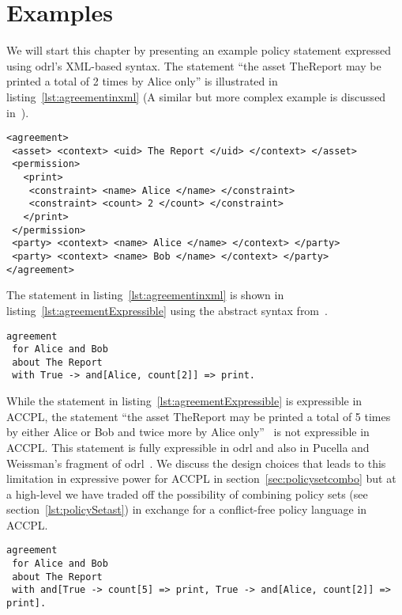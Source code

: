 \chapter{Examples}

We will start this chapter by presenting an example policy statement expressed using \ac{odrl}'s XML-based syntax. The statement ``the asset TheReport may be printed a total of 2 times by Alice only'' is illustrated in listing~\ref{lst:agreementinxml} (A similar but more complex example is discussed in~\cite{pucella2006}). 


\lstset{language=XML}
\begin{lstlisting}[caption={Agreement for Alice and Bob in XML},label={lst:agreementinxml}]
<agreement>
 <asset> <context> <uid> The Report </uid> </context> </asset>
 <permission>
   <print>
    <constraint> <name> Alice </name> </constraint>
    <constraint> <count> 2 </count> </constraint>
   </print>
 </permission>
 <party> <context> <name> Alice </name> </context> </party>
 <party> <context> <name> Bob </name> </context> </party>
</agreement>
\end{lstlisting}

The statement in listing~\ref{lst:agreementinxml} is shown in listing~\ref{lst:agreementExpressible} using the abstract syntax from~\cite{pucella2006}.

\lstset{language=Pucella2006}
\begin{lstlisting}[frame=single, caption={Expressible in ACCPL},label={lst:agreementExpressible}]
agreement
 for Alice and Bob 
 about The Report 
 with True -> and[Alice, count[2]] => print.
\end{lstlisting}

While the statement in listing~\ref{lst:agreementExpressible} is expressible in \ac{ACCPL}, the statement ``the asset TheReport may be printed a total of 5 times by either Alice or Bob and twice more by Alice only''~\cite{pucella2006} is not expressible in \ac{ACCPL}. This statement is fully expressible in \ac{odrl} and also in Pucella and Weissman's fragment of \ac{odrl}~\cite{pucella2006}. We discuss the design choices that leads to this limitation in expressive power for \ac{ACCPL} in section~\ref{sec:policysetcombo} but at a high-level we have traded off the possibility of combining policy sets (see section~\ref{lst:policySetast}) in exchange for a conflict-free policy language in \ac{ACCPL}.

\lstset{language=Pucella2006}
\begin{minipage}[c]{0.95\textwidth}
\begin{lstlisting}[frame=single, caption={Not Expressible in ACCPL},label={lst:agreementNotExpressible}]
agreement
 for Alice and Bob 
 about The Report 
 with and[True -> count[5] => print, True -> and[Alice, count[2]] => print].
\end{lstlisting}
\end{minipage}